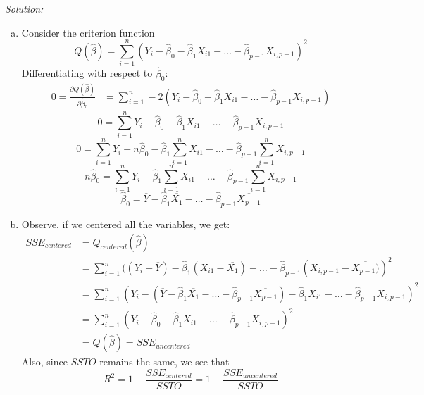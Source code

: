 \documentclass{article}
\newenvironment{solution}
    {\textit{Solution:}}
    {}
\begin{document}
\begin{solution}
\begin{enumerate}[(a)]
\item Consider the criterion function 
$$Q(\hat \beta) = \sum_{i = 1}^n (Y_i - \hat \beta_0 - \hat \beta_1 X_{i1} - \ldots - \hat \beta_{p -1 } X_{i, p-1})^2$$
Differentiating with respect to $\hat \beta_0$: 
\begin{align*} 
0 = \frac{\partial Q(\hat \beta)}{\partial \hat \beta_0} &= \sum_{i = 1}^n -2 (Y_i - \hat \beta_0 - \hat \beta_1 X_{i1} - \ldots - \hat \beta_{p -1 } X_{i, p-1}) 
\end{align*}
$$0 = \sum_{i = 1}^n Y_i - \hat \beta_0 - \hat \beta_1 X_{i1} - \ldots - \hat \beta_{p -1 } X_{i, p-1}$$
$$0 = \sum_{i = 1}^n Y_i - n \hat \beta_0 - \hat \beta_1 \sum_{i = 1}^n X_{i1} - \ldots -  \hat \beta_{p -1 }  \sum_{i = 1}^n X_{i, p-1}$$
$$n \hat \beta_0 =  \sum_{i = 1}^n Y_i - \hat \beta_1 \sum_{i = 1}^n X_{i1} - \ldots -  \hat \beta_{p -1 }  \sum_{i = 1}^n X_{i, p-1}$$
$$\hat \beta_0 =  \overline{Y} - \hat \beta_1 \overline{X_{1}} - \ldots -  \hat \beta_{p -1 }  \overline{X_{p-1}}$$
\item Observe, if we centered all the variables, we get: 
\begin{align*}
SSE_{centered} &= Q_{centered}(\hat \beta) \\
&= \sum_{i = 1}^n ( (Y_i - \overline{Y}) - \hat \beta_1 (X_{i1} - \overline{X_1}) - \ldots - \hat \beta_{p -1 } (X_{i, p-1} - \overline{X_{p - 1})})^2 \\
&= \sum_{i = 1}^n (Y_i - (  \overline{Y} - \hat \beta_1 \overline{X_{1}} - \ldots -  \hat \beta_{p -1 }  \overline{X_{p-1}})- \hat \beta_1 X_{i1} - \ldots - \hat \beta_{p -1 } X_{i, p-1})^2 \\
&= \sum_{i = 1}^n (Y_i - \hat \beta_0 - \hat \beta_1 X_{i1} - \ldots - \hat \beta_{p -1 } X_{i, p-1})^2 \\
&= Q(\hat \beta) = SSE_{uncentered}
\end{align*}
Also, since $SSTO $ remains the same, we see that
$$R^2 = 1 - \frac{SSE_{centered}}{SSTO} =  1 - \frac{SSE_{uncentered}}{SSTO}$$
\end{enumerate}
\end{solution}
\end{document}
